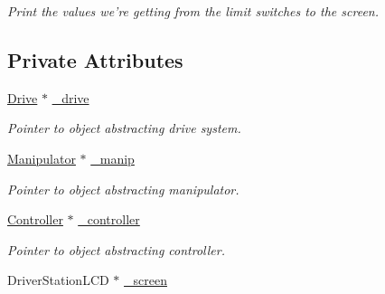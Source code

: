 \begin{DoxyCompactItemize}
\begin{DoxyCompactList}\small\item\em Print the values we're getting from the limit switches to the screen. \item\end{DoxyCompactList}\end{DoxyCompactItemize}
\subsection*{Private Attributes}
\begin{DoxyCompactItemize}
\item 
\hypertarget{class_r_j_f_r_c2011_1_1_teleoperated_a6ca6803f40fe02528cbddae4df3fc53c}{
\hyperlink{class_r_j_f_r_c2011_1_1_drive}{Drive} $\ast$ \hyperlink{class_r_j_f_r_c2011_1_1_teleoperated_a6ca6803f40fe02528cbddae4df3fc53c}{\_\-drive}}
\label{class_r_j_f_r_c2011_1_1_teleoperated_a6ca6803f40fe02528cbddae4df3fc53c}

\begin{DoxyCompactList}\small\item\em Pointer to object abstracting drive system. \item\end{DoxyCompactList}\item 
\hypertarget{class_r_j_f_r_c2011_1_1_teleoperated_a938412c0aafbe49631d154b04328c5d2}{
\hyperlink{class_r_j_f_r_c2011_1_1_manipulator}{Manipulator} $\ast$ \hyperlink{class_r_j_f_r_c2011_1_1_teleoperated_a938412c0aafbe49631d154b04328c5d2}{\_\-manip}}
\label{class_r_j_f_r_c2011_1_1_teleoperated_a938412c0aafbe49631d154b04328c5d2}

\begin{DoxyCompactList}\small\item\em Pointer to object abstracting manipulator. \item\end{DoxyCompactList}\item 
\hypertarget{class_r_j_f_r_c2011_1_1_teleoperated_a2cced8bfdcdcfdd4ac8603aa96d56781}{
\hyperlink{class_r_j_f_r_c2011_1_1_controller}{Controller} $\ast$ \hyperlink{class_r_j_f_r_c2011_1_1_teleoperated_a2cced8bfdcdcfdd4ac8603aa96d56781}{\_\-controller}}
\label{class_r_j_f_r_c2011_1_1_teleoperated_a2cced8bfdcdcfdd4ac8603aa96d56781}

\begin{DoxyCompactList}\small\item\em Pointer to object abstracting controller. \item\end{DoxyCompactList}\item 
\hypertarget{class_r_j_f_r_c2011_1_1_teleoperated_a7661f30a1cf9f7086d3ab8581488f048}{
DriverStationLCD $\ast$ \hyperlink{class_r_j_f_r_c2011_1_1_teleoperated_a7661f30a1cf9f7086d3ab8581488f048}{\_\-screen}}
\label{class_r_j_f_r_c2011_1_1_teleoperated_a7661f30a1cf9f7086d3ab8581488f048}


\end{DoxyCompactItemize}
